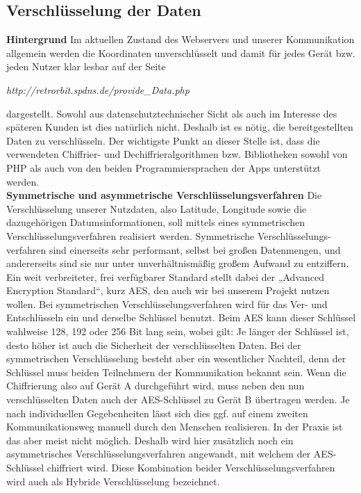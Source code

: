 \subsection{Verschlüsselung der Daten}
\textbf{Hintergrund }Im aktuellen Zustand des Webservers und unserer Kommunikation allgemein werden die Koordinaten unverschlüsselt und damit für jedes Gerät bzw. jeden Nutzer klar lesbar auf der Seite
 \begin{center}
 	\textit{http://retrorbit.spdns.de/provide\_Data.php }
 \end{center}
 dargestellt. Sowohl aus datenschutztechnischer Sicht als auch im Interesse des späteren Kunden ist dies natürlich nicht. Deshalb ist es nötig, die bereitgestellten Daten zu verschlüsseln. Der wichtigste Punkt an dieser Stelle ist, dass die verwendeten Chiffrier- und Dechiffrieralgorithmen bzw. Bibliotheken sowohl von PHP als auch von den beiden Programmiersprachen der Apps unterstützt werden.
\\
\textbf{Symmetrische und asymmetrische Verschlüsselungsverfahren }Die Verschlüsselung unserer Nutzdaten, also Latitude, Longitude sowie die dazugehörigen Datumsinformationen, soll mittels eines symmetrischen Verschlüsselungsverfahren realisiert werden. Symmetrische Verschlüsselungs-verfahren sind einerseits sehr performant, selbst bei großen Datenmengen, und andererseits sind sie nur unter unverhältnismäßig großem Aufwand zu entziffern. Ein weit verbreiteter, frei verfügbarer Standard stellt dabei der „Advanced Encryption Standard“, kurz AES, den auch wir bei unserem Projekt nutzen wollen. Bei symmetrischen Verschlüsselungsverfahren wird für das Ver- und Entschlüsseln ein und derselbe Schlüssel benutzt. Beim AES kann dieser Schlüssel wahlweise 128, 192 oder 256 Bit lang sein, wobei gilt: Je länger der Schlüssel ist, desto höher ist auch die Sicherheit der verschlüsselten Daten. Bei der symmetrischen Verschlüsselung besteht aber ein wesentlicher Nachteil, denn der Schlüssel muss beiden Teilnehmern der Kommunikation bekannt sein. Wenn die Chiffrierung also auf Gerät A durchgeführt wird, muss neben den nun verschlüsselten Daten auch der AES-Schlüssel zu Gerät B übertragen werden. Je nach individuellen Gegebenheiten lässt sich dies ggf. auf einem zweiten Kommunikationsweg manuell durch den Menschen realisieren. In der Praxis ist das aber meist nicht möglich. Deshalb wird hier zusätzlich noch ein asymmetrisches Verschlüsselungsverfahren angewandt, mit welchem der AES-Schlüssel chiffriert wird. Diese Kombination beider Verschlüsselungsverfahren wird auch als Hybride Verschlüsselung bezeichnet.
